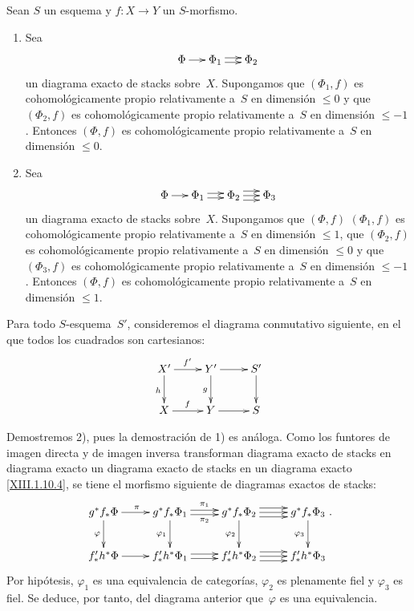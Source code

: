 
\begingroup
\shorthandoff{<>}%
\begin{proposition}
\label{XIII.1.12}
Sean $S$ un esquema y $f\colon X \to Y$ un $S$-morfismo.
\begin{enumerate}
\item[1)] Sea
$$
\xymatrix@C=.5cm{ \Phi \ar[r] & \Phi_1 \ar@<2pt>[r] \ar@<-2pt>[r] &
\Phi_2 }
$$
un diagrama exacto de stacks sobre~$X$. Supongamos que $(\Phi_1, f)$ es
cohomológicamente propio relativamente a~$S$ en dimensión
$\leqslant 0$ y que $(\Phi_2, f)$ es cohomológicamente propio relativamente
a~$S$ en dimensión $\leqslant -1$. Entonces $(\Phi,f)$ es
cohomológicamente propio relativamente a~$S$ en dimensión $\leqslant 0$.

\item[2)] Sea
$$
\xymatrix@C=.5cm{ \Phi \ar[r] & \Phi_1 \ar@<2pt>[r] \ar@<-2pt>[r] &
\Phi_2 \ar@<4pt>[r] \ar[r] \ar@<-4pt>[r] & \Phi_3 }
$$
un diagrama exacto de stacks sobre~$X$. Supongamos que
{$(\Phi,f)$}
{$(\Phi_1,f)$}
es cohomológicamente propio relativamente a~$S$ en dimensión
$\leqslant 1$, que $(\Phi_2, f)$ es cohomológicamente propio
relativamente a~$S$ en dimensión $\leqslant 0$ y que
$(\Phi_3, f)$ es cohomológicamente propio
{}
{relativamente}
a~$S$ en dimensión $\leqslant -1$. Entonces $(\Phi,f)$ es
cohomológicamente propio relativamente a~$S$ en dimensión $\leqslant 1$.
\end{enumerate}
\end{proposition}

Para todo $S$-esquema~$S'$, consideremos el diagrama conmutativo siguiente,
en el que todos los cuadrados son cartesianos:
$$
\xymatrix{ X' \ar[r]^{f'} \ar[d]_h & Y' \ar[r] \ar[d]_g & S' \ar[d] \\
X \ar[r]^f & Y \ar[r] & S }
$$

Demostremos 2), pues la demostración de 1) es análoga. Como los funtores de
imagen directa y de imagen inversa transforman
{diagrama exacto de stacks en diagrama exacto}
{un diagrama exacto de stacks en un diagrama exacto}
\eqref{XIII.1.10.4}, se tiene el morfismo siguiente
de diagramas exactos de stacks:
$$
\xymatrix{ g^* f_* \Phi \ar[r]^\pi \ar[d]_{\varphi} & g^*
f_* \Phi_1 \ar@<2pt>[r]^{\pi_1} \ar@<-2pt>[r]_{\pi_2}
\ar[d]_{\varphi_1} & g^* f_* \Phi_2 \ar@<4pt>[r] \ar[r]
\ar@<-4pt>[r] \ar[d]_{\varphi_2} & g^* f_* \Phi_3
\ar[d]_{\varphi_3} \\ f'_* h^* \Phi \ar[r] & f'_* h^*
\Phi_1 \ar@<2pt>[r] \ar@<-2pt>[r] & f'_* h^* \Phi_2
\ar@<4pt>[r] \ar[r] \ar@<-4pt>[r] & f'_* h^* \Phi_3 }
\text{.}
$$
Por hipótesis, $\varphi_1$ es una equivalencia de categorías,
$\varphi_2$ es plenamente fiel y $\varphi_3$ es fiel. Se deduce, por tanto,
del diagrama anterior que~$\varphi$ es una equivalencia.
\endgroup
